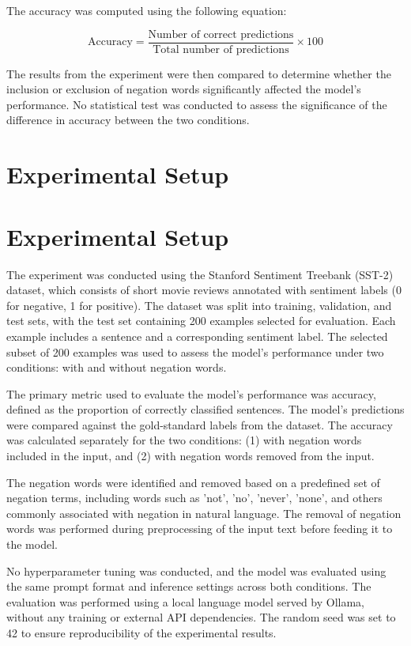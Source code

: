 \documentclass{article}
\begin{document}
The accuracy was computed using the following equation:

$$
\text{Accuracy} = \frac{\text{Number of correct predictions}}{\text{Total number of predictions}} \times 100
$$

The results from the experiment were then compared to determine whether the inclusion or exclusion of negation words significantly affected the model's performance. No statistical test was conducted to assess the significance of the difference in accuracy between the two conditions.
\section{Experimental Setup}
\section{Experimental Setup}

The experiment was conducted using the Stanford Sentiment Treebank (SST-2) dataset, which consists of short movie reviews annotated with sentiment labels (0 for negative, 1 for positive). The dataset was split into training, validation, and test sets, with the test set containing 200 examples selected for evaluation. Each example includes a sentence and a corresponding sentiment label. The selected subset of 200 examples was used to assess the model's performance under two conditions: with and without negation words.

The primary metric used to evaluate the model's performance was accuracy, defined as the proportion of correctly classified sentences. The model's predictions were compared against the gold-standard labels from the dataset. The accuracy was calculated separately for the two conditions: (1) with negation words included in the input, and (2) with negation words removed from the input.

The negation words were identified and removed based on a predefined set of negation terms, including words such as 'not', 'no', 'never', 'none', and others commonly associated with negation in natural language. The removal of negation words was performed during preprocessing of the input text before feeding it to the model.

No hyperparameter tuning was conducted, and the model was evaluated using the same prompt format and inference settings across both conditions. The evaluation was performed using a local language model served by Ollama, without any training or external API dependencies. The random seed was set to 42 to ensure reproducibility of the experimental results.
\end{document}
